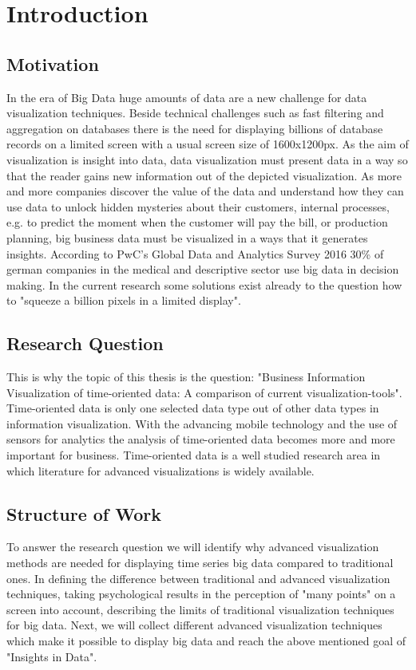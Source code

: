 \chapter{Introduction}
\label{chap:introduction}

\section{Motivation}
In the era of Big Data huge amounts of data are a new challenge for data visualization techniques. Beside technical challenges such as fast filtering and aggregation on databases there is the need for displaying billions of database records on a limited screen with a usual screen size of 1600x1200px. As the aim of visualization is insight into data, data visualization must present data in a way so that the reader gains new information out of the depicted visualization. 
As more and more companies discover the value of the data and understand how they can use data to unlock hidden mysteries about their customers, internal processes, e.g. to predict the moment when the customer will pay the bill, or production planning, big business data must be visualized in a ways that it generates insights. According to PwC's Global Data and Analytics Survey 2016 30\% of german companies in the medical and descriptive sector use big data in decision making. %
In the current research some solutions exist already to the question how to "squeeze a billion pixels in a limited display"\cite{Shneiderman2008}. 


\section{Research Question}
This is why the topic of this thesis is the question: "Business Information Visualization of time-oriented data: A comparison of current visualization-tools".
Time-oriented data is only one selected data type out of other data types in information visualization. With the advancing mobile technology and the use of sensors for analytics the analysis of time-oriented data becomes more and more important for business. Time-oriented data is a well studied research area in which literature for advanced visualizations is widely available. 


\section{Structure of Work}
To answer the research question we will identify why advanced visualization methods are needed for displaying time series big data compared to traditional ones.
In defining the difference between traditional and advanced visualization techniques, 
taking psychological results in the perception of "many points" on a screen into account, 
describing the limits of traditional visualization techniques for big data.
Next, we will collect different advanced visualization techniques which make it possible to display big data and reach the above mentioned goal of "Insights in Data". 

